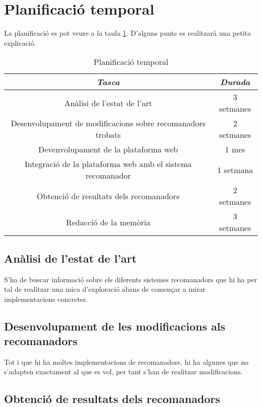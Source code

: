 \section{Planificació temporal}

La planificació es pot veure a la taula \ref{table-planing}. D'alguns punts es realitzarà una petita explicació.

\begin{table}[h!]
  \caption{Planificació temporal}
  \label{table-planing}
\begin{tabular}{|c|c|}
	\hline
	\emph{Tasca} & \emph{Durada} \\ \hline
	Anàlisi de l'estat de l'art & 3 setmanes  \\ \hline
	Desenvolupament de modificacions sobre recomanadors trobats & 2 setmanes  \\ \hline
	Devenvolupament de la plataforma web & 1 mes  \\ \hline
	Integració de la plataforma web amb el sistema recomanador & 1 setmana  \\ \hline
	Obtenció de resultats dels recomanadors & 2 setmanes  \\ \hline
	Redacció de la memòria & 3 setmanes \\
	\hline
\end{tabular}
\end{table}

\subsection{Anàlisi de l'estat de l'art}

S'ha de buscar informació sobre els diferents sistemes recomanadors que hi ha per tal de realitzar una mica d'exploració abans de començar a mirar implementacions concretes.

\subsection{Desenvolupament de les modificacions als recomanadors}

Tot i que hi ha moltes implementacions de recomanadors, hi ha algunes que no s'adapten exactament al que es vol, per tant s'han de realitzar modificacions.

\subsection{Obtenció de resultats dels recomanadors}

